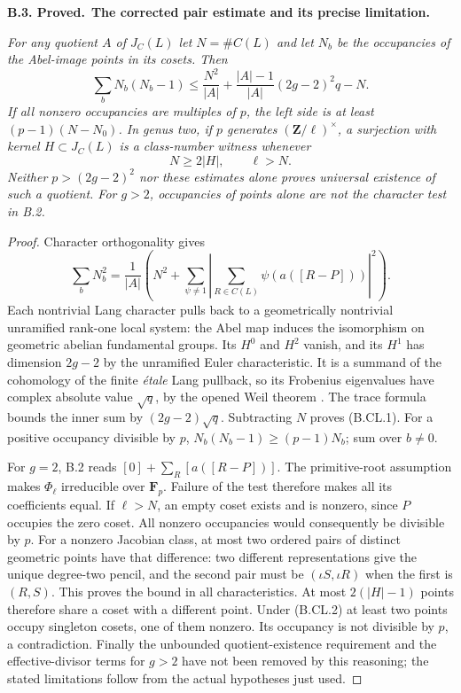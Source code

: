 \documentclass[11pt,a4paper]{article}
\newenvironment{claim}[3]{\par\medskip\noindent\hypertarget{#1}{\textbf{#1. #2.}}\ \textbf{#3.}\par\nopagebreak\smallskip\begingroup\itshape}{\endgroup\par\smallskip}
\begin{document}
\begin{claim}{B.3}{Proved}{The corrected pair estimate and its precise limitation}
For any quotient $A$ of $J_C(L)$ let $N=\#C(L)$ and let
$N_b$ be the occupancies of the Abel-image points in its cosets.
Then
\[
 \sum_bN_b(N_b-1)
 \le \frac{N^2}{|A|}
       +\frac{|A|-1}{|A|}(2g-2)^2q-N.                    \tag{B.CL.1}
\]
If all nonzero occupancies are multiples of $p$, the left side
is at least $(p-1)(N-N_0)$. In genus two, if $p$ generates
$(\mathbf Z/\ell)^\times$, a surjection with kernel
$H\subset J_C(L)$ is a class-number witness whenever
\[
                       N\ge2|H|,\qquad \ell>N.         \tag{B.CL.2}
\]
Neither $p>(2g-2)^2$ nor these estimates alone proves universal
existence of such a quotient. For $g>2$, occupancies of points
alone are not the character test in B.2.
\end{claim}
\begin{proof}
Character orthogonality gives
\[
 \sum_bN_b^2=\frac{1}{|A|}
       \left(N^2+\sum_{\psi\ne1}
          \left|\sum_{R\in C(L)}\psi(a([R-P]))\right|^2\right).
\]
Each nontrivial Lang character pulls back to a geometrically
nontrivial unramified rank-one local system: the Abel map
induces the isomorphism on geometric abelian fundamental groups.
Its $H^0$ and $H^2$ vanish, and its $H^1$ has dimension
$2g-2$ by the unramified Euler characteristic. It is a summand
of the cohomology of the finite \emph{\'etale} Lang pullback,
so its Frobenius eigenvalues have complex absolute value
$\sqrt q$, by the opened Weil theorem
\citep[Theorem~1.6 and formula~1.5.1]{WeilCurves}.
The trace formula bounds the inner sum by $(2g-2)\sqrt q$.
Subtracting $N$ proves (B.CL.1). For a positive occupancy
divisible by $p$, $N_b(N_b-1)\ge(p-1)N_b$; sum over $b\ne0$.

For $g=2$, B.2 reads $[0]+\sum_R[a([R-P])]$.
The primitive-root assumption makes $\Phi_\ell$ irreducible
over $\mathbf F_p$. Failure of the test therefore makes all
its coefficients equal. If $\ell>N$, an empty coset exists
and is nonzero, since $P$ occupies the zero coset. All nonzero
occupancies would consequently be divisible by $p$.
For a nonzero Jacobian class, at most two ordered pairs of
distinct geometric points have that difference: two different
representations give the unique degree-two pencil, and the
second pair must be $(\iota S,\iota R)$ when the first is
$(R,S)$. This proves the bound in all characteristics.
At most $2(|H|-1)$ points therefore share a coset with a
different point. Under (B.CL.2) at least two points occupy
singleton cosets, one of them nonzero. Its occupancy is not
divisible by $p$, a contradiction. Finally the unbounded
quotient-existence requirement and the effective-divisor terms
for $g>2$ have not been removed by this reasoning; the stated
limitations follow from the actual hypotheses just used.
\end{proof}
\end{document}
